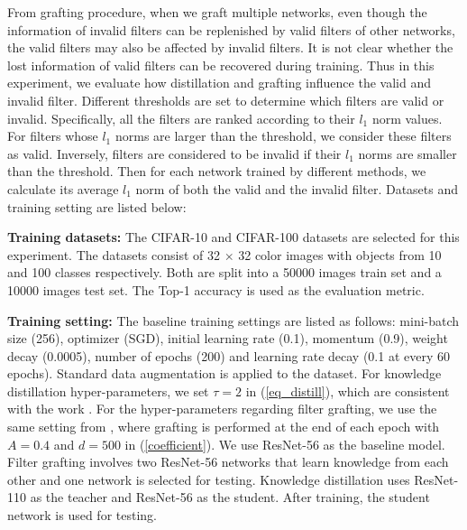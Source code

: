 \documentclass{article}
\begin{document}
From grafting procedure, when we graft multiple networks, even though the information of invalid filters can be replenished by valid filters of other networks, the valid filters may also be affected by invalid filters. It is not clear whether the lost information of valid filters can be recovered during training.
Thus in this experiment, we evaluate how distillation and grafting influence the valid and invalid filter. Different thresholds are set to determine which filters are valid or invalid. Specifically, all the filters are ranked according to their $l_{1}$ norm values. For filters whose $l_{1}$ norms are larger than the threshold, we consider these filters as valid. Inversely, filters are considered to be invalid if their $l_{1}$ norms are smaller than the threshold. Then for each network trained by different methods, we calculate its average $l_{1}$ norm of both the valid and the invalid filter. Datasets and training setting are listed below:

\textbf{Training datasets:} The CIFAR-10 and CIFAR-100 datasets are selected for this experiment. The datasets consist of 32 $\times$ 32 color images with objects from 10 and 100 classes respectively. Both are split into a 50000 images train set and a 10000 images test set. The Top-1 accuracy is used as the evaluation metric.

\textbf{Training setting:}  The baseline training settings are listed as follows: mini-batch size (256), optimizer (SGD), initial learning rate (0.1), momentum (0.9), weight decay (0.0005), number of epochs (200) and learning rate decay (0.1 at every 60 epochs). Standard data augmentation is applied to the dataset. For knowledge distillation hyper-parameters, we set $\tau = 2$ in (\ref{eq_distill}), which are consistent with the work \cite{yang2019snapshot}. For the hyper-parameters regarding filter grafting, we use the same setting from \cite{meng2020filter}, where grafting is performed at the end of each epoch with $A = 0.4$ and $d=500$ in (\ref{coefficient}). We use ResNet-56 as the baseline model. Filter grafting involves two ResNet-56 networks that learn knowledge from each other and one network is selected for testing. Knowledge distillation uses ResNet-110 as the teacher and ResNet-56 as the student. After training, the student network is used for testing.
\end{document}
